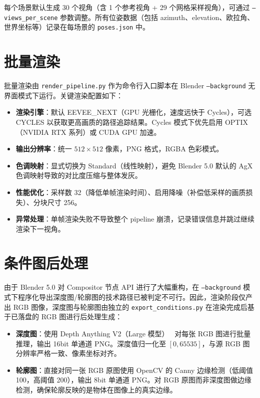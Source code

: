 每个场景默认生成 30 个视角（含 1 个参考视角 + 29 个网格采样视角），可通过 \texttt{--views\_per\_scene} 参数调整。所有位姿数据（包括 azimuth、elevation、欧拉角、世界坐标等）记录在每场景的 \texttt{poses.json} 中。

\section{批量渲染}

批量渲染由 \texttt{render\_pipeline.py} 作为命令行入口脚本在 Blender \texttt{--background} 无界面模式下运行。关键渲染配置如下：

\begin{itemize}
    \item \textbf{渲染引擎}：默认 EEVEE\_NEXT（GPU 光栅化，速度远快于 Cycles），可选 CYCLES 以获取更高画质的路径追踪结果。Cycles 模式下优先启用 OPTIX（NVIDIA RTX 系列）或 CUDA GPU 加速。
    \item \textbf{输出分辨率}：统一 $512 \times 512$ 像素，PNG 格式，RGBA 色彩模式。
    \item \textbf{色调映射}：显式切换为 Standard（线性映射），避免 Blender 5.0 默认的 AgX 色调映射导致的对比度压缩与整体发灰。
    \item \textbf{性能优化}：采样数 32（降低单帧渲染时间）、启用降噪（补偿低采样的画质损失）、分块尺寸 256。
    \item \textbf{异常处理}：单帧渲染失败不导致整个 pipeline 崩溃，记录错误信息并跳过继续渲染下一视角。
\end{itemize}

\section{条件图后处理}

由于 Blender 5.0 对 Compositor 节点 API 进行了大幅重构，在 \texttt{--background} 模式下程序化导出深度图/轮廓图的技术路径已被判定不可行。因此，渲染阶段仅产出 RGB 图像，深度图与轮廓图由独立的 \texttt{export\_conditions.py} 在渲染完成后基于已落盘的 RGB 图进行后处理生成：

\begin{itemize}
    \item \textbf{深度图}：使用 Depth Anything V2（Large 模型）~\cite{yang2024depthanythingv2} 对每张 RGB 图进行批量推理，输出 16bit 单通道 PNG。深度值归一化至 $[0, 65535]$，与源 RGB 图分辨率严格一致、像素坐标对齐。
    \item \textbf{轮廓图}：直接对同一张 RGB 原图使用 OpenCV 的 Canny 边缘检测（低阈值 100，高阈值 200），输出 8bit 单通道 PNG。对 RGB 原图而非深度图做边缘检测，确保轮廓反映的是物体在图像上的真实边缘。
\end{itemize}

